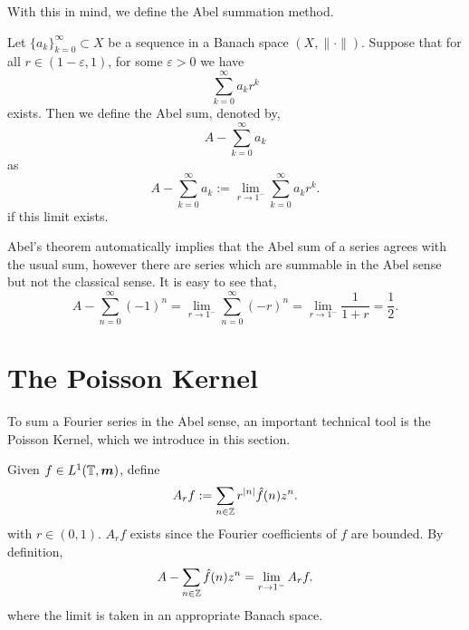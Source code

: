 With this in mind, we define the Abel summation method.
\begin{definition}
    Let $\{a_k\}_{k=0}^\infty \subset X$ be a sequence in a Banach space $(X,\|\cdot\|)$. Suppose that for 
    all $r \in (1-\varepsilon,1)$, for some $\varepsilon > 0$ we have
    \begin{equation*}
        \sum_{k=0}^\infty a_k r^k
    \end{equation*}
    exists.
    Then we define the Abel sum, 
    denoted by,
    \begin{equation*}
        A-\sum_{k=0}^\infty a_k
    \end{equation*}
    as
    \begin{equation*}
        A-\sum_{k=0}^\infty a_k := \lim_{r\rightarrow 1^-} \sum_{k=0}^\infty a_k r^k.
    \end{equation*}
    if this limit exists.
\end{definition}
Abel's theorem automatically implies that the Abel sum of a series
agrees with the usual sum, however there are series which are summable
in the Abel sense but not the classical sense. It is easy to see that,
\begin{equation*}
    A-\sum_{n=0}^\infty (-1)^n = \lim_{r\rightarrow 1^-} \sum_{n=0}^\infty (-r)^n = \lim_{r\rightarrow 1^-} \frac{1}{1+r} = \frac{1}{2}.
\end{equation*}

\section{The Poisson Kernel}
To sum a Fourier series in the Abel sense, an important technical
tool is the Poisson Kernel, which we introduce in this section. 

Given $f \in L^1(\mathbb{T},\boldsymbol{m})$, define
\begin{equation*}
    A_r f := \sum_{n \in \mathbb{Z}} r^{|n|} \hat{f}(n) z^n.
\end{equation*}
with $r \in (0,1)$.
$A_r f$ exists since the Fourier coefficients of $f$ are bounded. By definition,
\begin{equation*}
    A-\sum_{n\in \mathbb{Z}} \hat{f}(n) z^n = \lim_{r\rightarrow 1^-} A_r f.
\end{equation*}
where the limit is taken in an appropriate Banach space.

